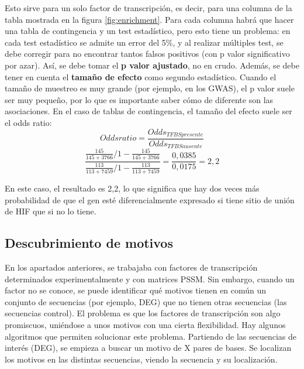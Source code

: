 Esto sirve para un solo factor de transcripción, es decir, para una columna de la tabla mostrada en la figura \ref{fig:enrichment}. Para cada columna habrá que hacer una tabla de contingencia y un test estadístico, pero esto tiene un problema: en cada test estadístico se admite un error del 5\%, y al realizar múltiples test, se debe corregir para no encontrar tantos falsos positivos (con p valor significativo por azar). Así, se debe tomar el \textbf{p valor ajustado}, no en crudo. Además, se debe tener en cuenta el \textbf{tamaño de efecto} como segundo estadístico. Cuando el tamaño de muestreo es muy grande (por ejemplo, en los GWAS), el p valor suele ser muy pequeño, por lo que es importante saber cómo de diferente son las asociaciones. En el caso de tablas de contingencia, el tamaño del efecto suele ser el odds ratio:
$$Odds ratio = \frac{Odds_{TFBSpresente}}{Odds_{TFBSausente}}$$
$$\frac{\frac{145}{145+3766}/1-\frac{145}{145+3766}}{\frac{113}{113+7459}/1-\frac{113}{113+7459}} = \frac{0,0385}{0,0175} = 2,2$$

En este caso, el resultado es 2,2, lo que significa que hay dos veces más probabilidad de que el gen esté diferencialmente expresado si tiene sitio de unión de HIF que si no lo tiene. 

\subsection{Descubrimiento de motivos}
En los apartados anteriores, se trabajaba con factores de transcripción determinados experimentalmente y con matrices PSSM. Sin embargo, cuando un factor no se conoce, se puede identificar qué motivos tienen en común un conjunto de secuencias (por ejemplo, DEG) que no tienen otras secuencias (las secuencias control). El problema es que los factores de transcripción son algo promiscuos, uniéndose a unos motivos con una cierta flexibilidad. Hay algunos algoritmos que permiten solucionar este problema. Partiendo de las secuencias de interés (DEG), se empieza a buscar un motivo de X pares de bases. Se localizan los motivos en las distintas secuencias, viendo la secuencia y su localización. 

